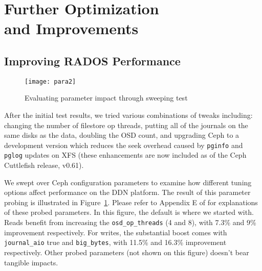 \section{Further Optimization \\and Improvements}
\label{sec:ceph-tuning}

\subsection{Improving RADOS Performance}

\begin{figure}[h]
\centering
\texttt{[image: para2]}
\caption{Evaluating parameter impact through sweeping test}
\label{fig:parametric}
\end{figure}

After the initial test results, we tried various combinations of tweaks
including: changing the number of filestore op threads, putting all of the
journals on the same disks as the data, doubling the OSD count, and upgrading
Ceph to a development version which reduces the seek overhead caused by
\texttt{pginfo} and \texttt{pglog} updates on XFS (these enhancements are now
included as of the Ceph Cuttlefish release, v0.61).  


We swept over Ceph configuration parameters to examine how different tuning
options affect performance on the DDN platform. The result of this parameter
probing is illustrated in Figure~\ref{fig:parametric}. Please refer to
Appendix E of \cite{ceph:techreport} for explanations of these probed
parameters. In this figure, the default is where we started with. Reads
benefit from increasing the \verb!osd_op_threads! (4 and 8), with 7.3\% and
9\% improvement respectively. For writes, the substantial boost comes with
\verb!journal_aio! true and \verb!big_bytes!, with 11.5\% and 16.3\%
improvement respectively. Other probed parameters (not shown on this figure)
doesn't bear tangible impacts.



